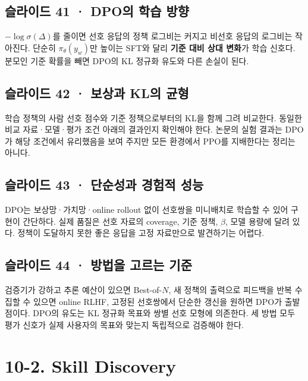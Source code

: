 \documentclass[11pt,a4paper]{article}
\begin{document}
\subsection{슬라이드 41 · DPO의 학습 방향}

$-\log\sigma(\Delta)$를 줄이면 선호 응답의 정책 로그비는 커지고 비선호 응답의 로그비는 작아진다. 단순히 $\pi_\theta(y_w)$만 높이는 SFT와 달리 \textbf{기준 대비 상대 변화}가 학습 신호다. 분모인 기준 확률을 빼면 DPO의 KL 정규화 유도와 다른 손실이 된다.\par

\subsection{슬라이드 42 · 보상과 KL의 균형}

학습 정책의 사람 선호 점수와 기준 정책으로부터의 KL을 함께 그려 비교한다. 동일한 비교 자료·모델·평가 조건 아래의 결과인지 확인해야 한다. 논문의 실험 결과는 DPO가 해당 조건에서 유리했음을 보여 주지만 모든 환경에서 PPO를 지배한다는 정리는 아니다.\par

\subsection{슬라이드 43 · 단순성과 경험적 성능}

DPO는 보상망·가치망·online rollout 없이 선호쌍을 미니배치로 학습할 수 있어 구현이 간단하다. 실제 품질은 선호 자료의 coverage, 기준 정책, $\beta$, 모델 용량에 달려 있다. 정책이 도달하지 못한 좋은 응답을 고정 자료만으로 발견하기는 어렵다.\par

\subsection{슬라이드 44 · 방법을 고르는 기준}

검증기가 강하고 추론 예산이 있으면 Best-of-$N$, 새 정책의 출력으로 피드백을 반복 수집할 수 있으면 online RLHF, 고정된 선호쌍에서 단순한 갱신을 원하면 DPO가 출발점이다. DPO의 유도는 KL 정규화 목표와 쌍별 선호 모형에 의존한다. 세 방법 모두 평가 신호가 실제 사용자의 목표와 맞는지 독립적으로 검증해야 한다.\par

\clearpage
\section{10-2. Skill Discovery}
\end{document}
